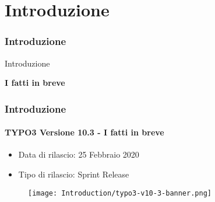 %

\section{Introduzione}
\begin{frame}[fragile]
	\frametitle{Introduzione}

	\begin{center}\huge{Introduzione}\end{center}
	\begin{center}\huge{\color{typo3darkgrey}\textbf{I fatti in breve}}\end{center}

\end{frame}


\begin{frame}[fragile]
	\frametitle{Introduzione}
	\framesubtitle{TYPO3 Versione 10.3 - I fatti in breve}

	\begin{itemize}
		\item Data di rilascio: 25 Febbraio 2020
		\item Tipo di rilascio: Sprint Release
	\end{itemize}

	\begin{figure}
		\texttt{[image: Introduction/typo3-v10-3-banner.png]}
	\end{figure}

\end{frame}


